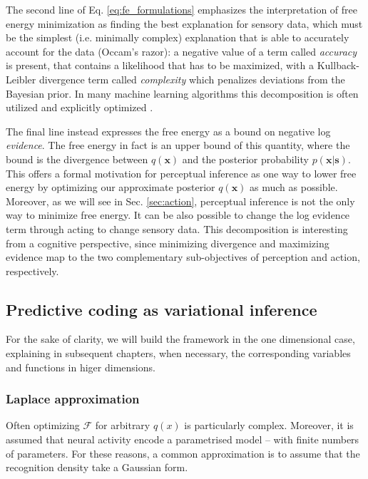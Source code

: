 \documentclass[10pt]{article}
\begin{document}
The second line of Eq. \ref{eq:fe_formulations} emphasizes the interpretation of free energy minimization as finding the best explanation for sensory data, which must be the simplest (i.e. minimally complex) explanation that is able to accurately account for the data (Occam's razor): a negative value of a term called \emph{accuracy} is present, that contains a likelihood that has to be maximized, with a Kullback-Leibler divergence term called \emph{complexity} which penalizes deviations from the Bayesian prior. 
In many machine learning algorithms this decomposition is often utilized and explicitly optimized \citep{Kingma2013}.

The final line instead expresses the free energy as a bound on negative log \emph{evidence}. 
The free energy in fact is an upper bound of this quantity, where the bound is the divergence between $q(\bm x)$ and the posterior probability $p(\bm x | \bm s)$. 
This offers a formal motivation for perceptual inference as one way to lower free energy by optimizing our approximate posterior $q(\bm x)$ as much as possible. 
Moreover, as we will see in Sec. \ref{sec:action}, perceptual inference is not the only way to minimize free energy. 
It can be also possible to change the log evidence term through acting to change sensory data. This decomposition is interesting from a cognitive perspective, since minimizing divergence and maximizing evidence map to the two complementary sub-objectives of perception and action, respectively.

\subsection{Predictive coding as variational inference}
\label{sec:vfe_1d}
For the sake of clarity, we will build the framework in the one dimensional case, explaining in subsequent chapters, when necessary, the corresponding variables and functions in higer dimensions.

\subsubsection{Laplace approximation}
\label{sec:laplace}

Often optimizing $\mathcal{F}$ for arbitrary $q(x)$ is particularly complex. Moreover, it is assumed that neural activity encode a parametrised model -- with finite numbers of parameters.
For these reasons, a common approximation is to assume that the recognition density take a Gaussian form. 
\end{document}
